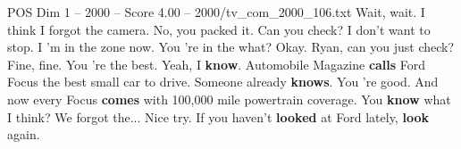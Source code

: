 \begin{textsample}{POS Dim 1 – 2000 – Score 4.00 – 2000/tv\_com\_2000\_106.txt}  \label{ex:f1_pos_075}
Wait, wait.
I think I forgot the camera.
No, you packed it.
Can you check?
I don't want to stop.
I 'm in the zone now.
You 're in the what?
Okay.
Ryan, can you just check?
Fine, fine.
You 're the best.
Yeah, I \textbf{know}.
Automobile Magazine \textbf{calls} Ford Focus the best small car to drive.
Someone already \textbf{knows}.
You 're good.
And now every Focus \textbf{comes} with 100,000 mile powertrain coverage.
You \textbf{know} what I think?
We forgot the...
Nice try.
If you haven't \textbf{looked} at Ford lately, \textbf{look} again.

\end{textsample}
